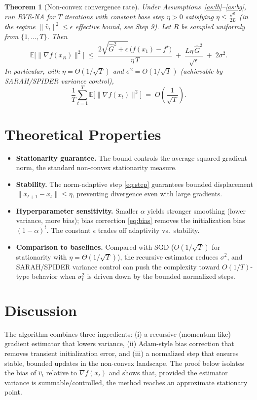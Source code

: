 \documentclass[11pt]{article}
\newtheorem{theorem}{Theorem}
\begin{document}
\begin{theorem}[Non-convex convergence rate]\label{thm:main}
Under Assumptions~\ref{as:lb}--\ref{as:bg}, run RVE-NA for $T$ iterations with
constant base step $\eta>0$ satisfying $\eta \le \frac{\sqrt{\epsilon}}{2L}$ (in the regime
$\|\hat v_t\|^2 \le \epsilon$ effective bound, see Step 9). Let $R$ be sampled uniformly
from $\{1,\dots,T\}$. Then
\[
\mathbb{E}\big[\|\nabla f(x_R)\|^2\big]
\;\le\;
\frac{2\sqrt{\hat G^2+\epsilon}\,\big(f(x_1)-f^\star\big)}{\eta\,T}
\;+\;
\frac{L\eta\, \hat G^2}{\sqrt{\epsilon}}
\;+\;
2\sigma^2 .
\]
In particular, with $\eta = \Theta(1/\sqrt{T})$ and $\sigma^2 = O(1/\sqrt{T})$ (achievable
by SARAH/SPIDER variance control), 
\[
\frac{1}{T}\sum_{t=1}^T \mathbb{E}\big[\|\nabla f(x_t)\|^2\big]
\;=\; O\!\left(\frac{1}{\sqrt{T}}\right).
\]
\end{theorem}

\section*{Theoretical Properties}

\begin{itemize}
\item \textbf{Stationarity guarantee.} The bound controls the average squared gradient norm,
the standard non-convex stationarity measure.
\item \textbf{Stability.} The norm-adaptive step \eqref{eq:step} guarantees bounded
displacement $\|x_{t+1}-x_t\| \le \eta$, preventing divergence even with large gradients.
\item \textbf{Hyperparameter sensitivity.} Smaller $\alpha$ yields stronger smoothing
(lower variance, more bias); bias correction \eqref{eq:bias} removes the initialization bias
$(1-\alpha)^t$. The constant $\epsilon$ trades off adaptivity vs.\ stability.
\item \textbf{Comparison to baselines.} Compared with SGD ($O(1/\sqrt{T})$ for stationarity
with $\eta=\Theta(1/\sqrt{T})$), the recursive estimator reduces $\sigma^2$, and SARAH/SPIDER
variance control can push the complexity toward $O(1/T)$-type behavior when $\sigma_t^2$ is
driven down by the bounded normalized steps.
\end{itemize}

\section*{Discussion}
The algorithm combines three ingredients: (i) a recursive (momentum-like) gradient estimator
that lowers variance, (ii) Adam-style bias correction that removes transient initialization
error, and (iii) a normalized step that ensures stable, bounded updates in the non-convex
landscape. The proof below isolates the bias of $\hat v_t$ relative to $\nabla f(x_t)$ and
shows that, provided the estimator variance is summable/controlled, the method reaches an
approximate stationary point.
\end{document}
